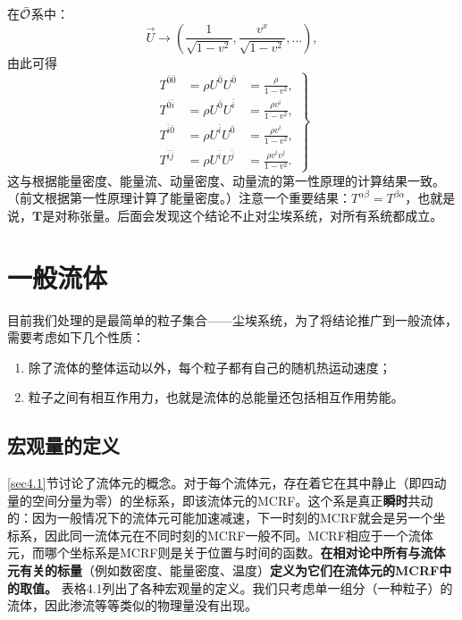 在$\bar{\mathcal{O}}$系中：
\[
    \vec{U} \to \left( \frac{1}{\sqrt{1 - v^2}}, \frac{v^x}{\sqrt{1 - v^2}}, \dots \right),
\]
由此可得
\begin{equation}
\left.
\begin{split}
    T^{\bar{0} \bar{0}} &= \rho U^{\bar{0}} U^{\bar{0}} &= \frac{\rho}{1 - v^2}, \\
    T^{\bar{0} \bar{i}} &= \rho U^{\bar{0}} U^{\bar{i}} &= \frac{ \rho v^i }{ 1 - v^2 }, \\
    T^{\bar{i} \bar{0}} &= \rho U^{\bar{i}} U^{\bar{0}} &= \frac{\rho v^i}{1 - v^2}, \\
    T^{\bar{i} \bar{j}} &= \rho U^{\bar{i}} U^{\bar{j}} &= \frac{\rho v^i v^j}{1 - v^2}.
\end{split}
\right\}
\label{equ4.21}
\end{equation}
这与根据能量密度、能量流、动量密度、动量流的第一性原理的计算结果一致。（前文根据第一性原理计算了能量密度。）注意一个重要结果：$T^{\alpha \beta} = T^{\beta \alpha}$，也就是说，$\mathbf{T}$是对称张量。后面会发现这个结论不止对尘埃系统，对所有系统都成立。


\section{一般流体}
\label{sec4.5}
目前我们处理的是最简单的粒子集合——尘埃系统，为了将结论推广到一般流体，需要考虑如下几个性质：
\begin{enumerate}
    \item 除了流体的整体运动以外，每个粒子都有自己的随机热运动速度；
    \item 粒子之间有相互作用力，也就是流体的总能量还包括相互作用势能。
\end{enumerate}

\subsection*{宏观量的定义}
\ref{sec4.1}节讨论了流体元的概念。对于每个流体元，存在着它在其中静止（即四动量的空间分量为零）的坐标系，即该流体元的MCRF。这个系是真正\textbf{瞬时}共动的：因为一般情况下的流体元可能加速减速，下一时刻的MCRF就会是另一个坐标系，因此同一流体元在不同时刻的MCRF一般不同。MCRF相应于一个流体元，而哪个坐标系是MCRF则是关于位置与时间的函数。\textbf{在相对论中所有与流体元有关的标量}（例如数密度、能量密度、温度）\textbf{定义为它们在流体元的MCRF中的取值。} 表格4.1列出了各种宏观量的定义。我们只考虑单一组分（一种粒子）的流体，因此渗流等等类似的物理量没有出现。


